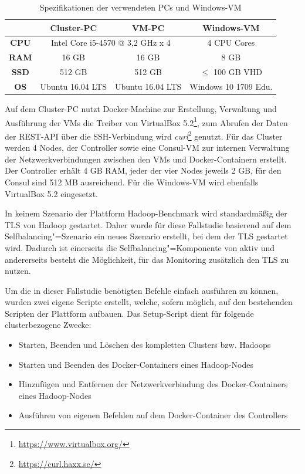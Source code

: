 \begin{table}
    \begin{tabular}{|c|c|c|c|}
    	\hline
    	 \textbf{}   & \textbf{Cluster-PC} &          \textbf{VM-PC}          & \textbf{Windows-VM}  \\ \hline\hline
    	\textbf{CPU} & \multicolumn{2}{|c|}{Intel Core i5-4570 @ 3,2 GHz x 4} &     4 CPU Cores      \\ \hline
    	\textbf{RAM} &        16 GB        &              16 GB               &         8 GB         \\ \hline
    	\textbf{SSD} &       512 GB        &              512 GB              &  $\leq$ 100 GB VHD   \\ \hline
    	\textbf{OS}  &  Ubuntu 16.04 LTS   &         Ubuntu 16.04 LTS         & Windows 10 1709 Edu. \\ \hline
    \end{tabular}
    \caption{Spezifikationen der verwendeten PCs und Windows-VM}
    \label{tab:pcSpecs}
\end{table}

Auf dem Cluster-PC nutzt Docker-Machine zur Erstellung, Verwaltung und Ausführung der VMs die Treiber von VirtualBox 5.2\footnote{\url{https://www.virtualbox.org/}}, zum Abrufen der Daten der REST-API über die SSH-Verbindung wird \emph{curl}\footnote{\url{https://curl.haxx.se/}} genutzt. Für das Cluster werden 4 Nodes, der Controller sowie eine Consul-VM zur internen Verwaltung der Netzwerkverbindungen zwischen den VMs und Docker-Containern erstellt. Der Controller erhält 4 GB RAM, jeder der vier Nodes jeweils 2 GB, für den Consul sind 512 MB ausreichend. Für die Windows-VM wird ebenfalls VirtualBox 5.2 eingesetzt.

In keinem Szenario der Plattform Hadoop-Benchmark wird standardmäßig der \ac{TLS} von Hadoop gestartet. Daher wurde für diese Fallstudie basierend auf dem Selfbalancing"=Szenario ein neues Szenario erstellt, bei dem der \ac{TLS} gestartet wird. Dadurch ist einerseits die Selfbalancing"=Komponente von \citeauthor{zhang2016} aktiv und andererseits besteht die Möglichkeit, für das Monitoring zusätzlich den \ac{TLS} zu nutzen.

Um die in dieser Fallstudie benötigten Befehle einfach ausführen zu können, wurden zwei eigene Scripte erstellt, welche, sofern möglich, auf den bestehenden Scripten der Plattform aufbauen. Das Setup-Script dient für folgende clusterbezogene Zwecke:

\begin{itemize}
    \item Starten, Beenden und Löschen des kompletten Clusters bzw. Hadoops
    \item Starten und Beenden des Docker-Containers eines Hadoop-Nodes
    \item Hinzufügen und Entfernen der Netzwerkverbindung des Docker-Containers eines Hadoop-Nodes
    \item Ausführen von eigenen Befehlen auf dem Docker-Container des Controllers
\end{itemize}

